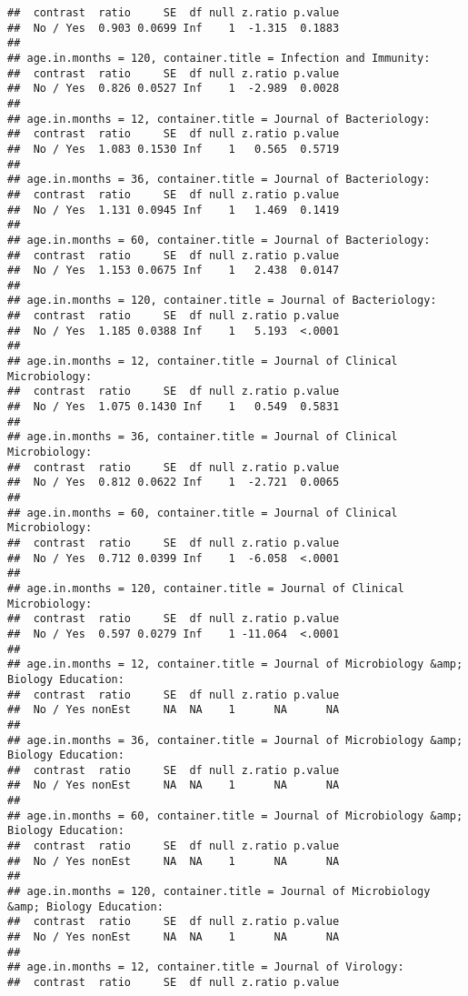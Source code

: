 \documentclass[
]{article}
\begin{document}
\begin{verbatim}
##  contrast  ratio     SE  df null z.ratio p.value
##  No / Yes  0.903 0.0699 Inf    1  -1.315  0.1883
## 
## age.in.months = 120, container.title = Infection and Immunity:
##  contrast  ratio     SE  df null z.ratio p.value
##  No / Yes  0.826 0.0527 Inf    1  -2.989  0.0028
## 
## age.in.months = 12, container.title = Journal of Bacteriology:
##  contrast  ratio     SE  df null z.ratio p.value
##  No / Yes  1.083 0.1530 Inf    1   0.565  0.5719
## 
## age.in.months = 36, container.title = Journal of Bacteriology:
##  contrast  ratio     SE  df null z.ratio p.value
##  No / Yes  1.131 0.0945 Inf    1   1.469  0.1419
## 
## age.in.months = 60, container.title = Journal of Bacteriology:
##  contrast  ratio     SE  df null z.ratio p.value
##  No / Yes  1.153 0.0675 Inf    1   2.438  0.0147
## 
## age.in.months = 120, container.title = Journal of Bacteriology:
##  contrast  ratio     SE  df null z.ratio p.value
##  No / Yes  1.185 0.0388 Inf    1   5.193  <.0001
## 
## age.in.months = 12, container.title = Journal of Clinical Microbiology:
##  contrast  ratio     SE  df null z.ratio p.value
##  No / Yes  1.075 0.1430 Inf    1   0.549  0.5831
## 
## age.in.months = 36, container.title = Journal of Clinical Microbiology:
##  contrast  ratio     SE  df null z.ratio p.value
##  No / Yes  0.812 0.0622 Inf    1  -2.721  0.0065
## 
## age.in.months = 60, container.title = Journal of Clinical Microbiology:
##  contrast  ratio     SE  df null z.ratio p.value
##  No / Yes  0.712 0.0399 Inf    1  -6.058  <.0001
## 
## age.in.months = 120, container.title = Journal of Clinical Microbiology:
##  contrast  ratio     SE  df null z.ratio p.value
##  No / Yes  0.597 0.0279 Inf    1 -11.064  <.0001
## 
## age.in.months = 12, container.title = Journal of Microbiology &amp; Biology Education:
##  contrast  ratio     SE  df null z.ratio p.value
##  No / Yes nonEst     NA  NA    1      NA      NA
## 
## age.in.months = 36, container.title = Journal of Microbiology &amp; Biology Education:
##  contrast  ratio     SE  df null z.ratio p.value
##  No / Yes nonEst     NA  NA    1      NA      NA
## 
## age.in.months = 60, container.title = Journal of Microbiology &amp; Biology Education:
##  contrast  ratio     SE  df null z.ratio p.value
##  No / Yes nonEst     NA  NA    1      NA      NA
## 
## age.in.months = 120, container.title = Journal of Microbiology &amp; Biology Education:
##  contrast  ratio     SE  df null z.ratio p.value
##  No / Yes nonEst     NA  NA    1      NA      NA
## 
## age.in.months = 12, container.title = Journal of Virology:
##  contrast  ratio     SE  df null z.ratio p.value

\end{verbatim}
\end{document}
